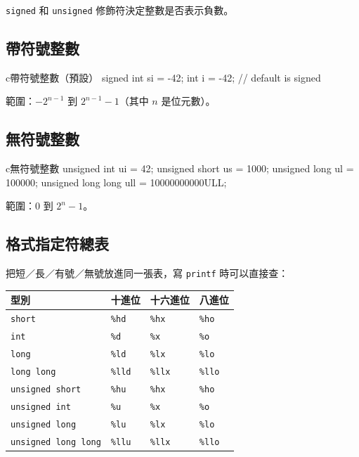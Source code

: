 \texttt{signed} 和 \texttt{unsigned} 修飾符決定整數是否表示負數。

\subsection{帶符號整數}

\begin{code}{c}{帶符號整數（預設）}
signed int si = -42;
int i = -42;             // default is signed
\end{code}

範圍：$-2^{n-1}$ 到 $2^{n-1} - 1$（其中 $n$ 是位元數）。

\subsection{無符號整數}

\begin{code}{c}{無符號整數}
unsigned int ui = 42;
unsigned short us = 1000;
unsigned long ul = 100000;
unsigned long long ull = 10000000000ULL;
\end{code}

範圍：$0$ 到 $2^n - 1$。

\subsection{格式指定符總表}

把短／長／有號／無號放進同一張表，寫 \texttt{printf} 時可以直接查：

\begin{center}
\begin{tabular}{|l|l|l|l|}
\hline
\textbf{型別} & \textbf{十進位} & \textbf{十六進位} & \textbf{八進位} \\
\hline
\texttt{short} & \texttt{\%hd} & \texttt{\%hx} & \texttt{\%ho} \\
\texttt{int} & \texttt{\%d} & \texttt{\%x} & \texttt{\%o} \\
\texttt{long} & \texttt{\%ld} & \texttt{\%lx} & \texttt{\%lo} \\
\texttt{long long} & \texttt{\%lld} & \texttt{\%llx} & \texttt{\%llo} \\
\texttt{unsigned short} & \texttt{\%hu} & \texttt{\%hx} & \texttt{\%ho} \\
\texttt{unsigned int} & \texttt{\%u} & \texttt{\%x} & \texttt{\%o} \\
\texttt{unsigned long} & \texttt{\%lu} & \texttt{\%lx} & \texttt{\%lo} \\
\texttt{unsigned long long} & \texttt{\%llu} & \texttt{\%llx} & \texttt{\%llo} \\
\hline
\end{tabular}
\end{center}

